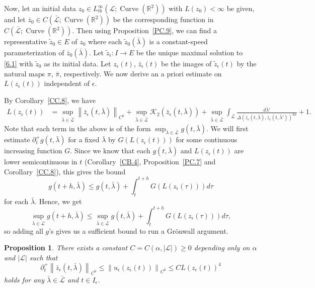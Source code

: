 \documentclass[reqno,centertags,12pt]{amsart}
\newtheorem{proposition}[theorem]{Proposition}
\theoremstyle{definition}
\numberwithin{equation}{section}
\newcommand{\abs}[1]{\left\lvert#1\right\rvert}
\newcommand{\norm}[1]{\left\|#1\right\|}
\newcommand{\bbR}{{\mathbb{R}}}
\begin{document}
Now, let an initial data $z_{0}\in L_{tb}^{\infty}(\mathcal{L};\operatorname{Curve}(\bbR^{2}))$
with $L(z_{0}) < \infty$ be given, and let
$\bar{z}_{0}\in C(\bar{\mathcal{L}};\operatorname{Curve}(\bbR^{2}))$
be the corresponding function in $C(\bar{\mathcal{L}};\operatorname{Curve}(\bbR^{2}))$. Then
using Proposition~\ref{PC.9}, we can find a representative $\tilde{z}_{0}\in E$
of $z_{0}$ where each $\tilde{z}_{0}(\bar{\lambda})$ is a constant-speed parameterization
of $\bar{z}_{0}(\bar{\lambda})$. Let $\tilde{z}_{\epsilon}\colon I\to E$ be the
unique maximal solution to \eqref{6.1} with $\tilde{z}_{0}$
as its initial data. Let $z_{\epsilon}(t)$, $\bar{z}_{\epsilon}(t)$ be the images of
$\tilde{z}_{\epsilon}(t)$ by the natural maps $\pi$, $\bar{\pi}$, respectively.
We now derive an a priori estimate on $L(z_{\epsilon}(t))$ independent of $\epsilon$.

By Corollary~\ref{CC.8}, we have
\begin{align*}
    L(z_{\epsilon}(t))
    &= \sup_{\bar{\lambda}\in\bar{\mathcal{L}}}
    \norm{\bar{z}_{\epsilon}(t,\bar{\lambda})}_{C^{0}}
    + \sup_{\bar{\lambda}\in\bar{\mathcal{L}}}
    \mathcal{K}_{2}\left(\bar{z}_{\epsilon}(t,\bar{\lambda})\right)
    + \sup_{\bar{\lambda}\in\bar{\mathcal{L}}}
    \int_{\bar{\mathcal{L}}}\frac{d\bar{\lambda}'}
    {\Delta(\bar{z}_{\epsilon}(t,\bar{\lambda}),
    \bar{z}_{\epsilon}(t,\bar{\lambda}'))^{2\alpha}} + 1.
\end{align*}
Note that each term in the above is of the form
$\sup_{\bar{\lambda}\in\bar{\mathcal{L}}}g(t,\bar{\lambda})$.
We will first estimate $\partial_{t}^{+}g(t,\bar{\lambda})$ for a fixed $\bar{\lambda}$ by
$G(L(z_{\epsilon}(t)))$ for some continuous increasing function $G$.
Since we know that each $g(t,\bar{\lambda})$ and $L(z_{\epsilon}(t))$ are
lower semicontinuous in $t$ (Corollary~\ref{CB.4},
Proposition~\ref{PC.7} and
Corollary~\ref{CC.8}), this gives the bound
\[
    g(t+h,\bar{\lambda}) \leq g(t,\bar{\lambda}) + \int_{t}^{t+h}
    G(L(z_{\epsilon}(\tau))) d\tau
\]
for each $\bar{\lambda}$. Hence, we get
\[
    \sup_{\bar{\lambda}\in\bar{\mathcal{L}}}g(t+h,\bar{\lambda})
    \leq \sup_{\bar{\lambda}\in\bar{\mathcal{L}}}g(t,\bar{\lambda})
    + \int_{t}^{t+h} G(L(z_{\epsilon}(\tau))) d\tau,
\]
so adding all $g$'s gives us a sufficient bound to run a Gr\"{o}nwall argument.

\begin{proposition}\label{P6.4}
    There exists a constant $C=C(\alpha,\abs{\mathcal{L}})\geq 0$ depending only on
    $\alpha$ and $\abs{\mathcal{L}}$ such that
    \[
        \partial_{t}^{+}\norm{\bar{z}_{\epsilon}(t,\bar{\lambda})}_{C^{0}}
        \leq \norm{u_{\epsilon}(z_{\epsilon}(t))}_{C^{0}}
        \leq CL(z_{\epsilon}(t))^{4}
    \]
    holds for any $\bar{\lambda}\in\bar{\mathcal{L}}$ and $t\in I_{\epsilon}$.
\end{proposition}
\end{document}
